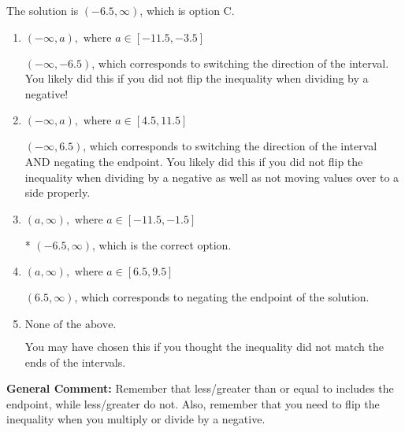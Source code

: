 \documentclass{extbook}[14pt]
\begin{document}
\begin{enumerate}
{The solution is \( (-6.5, \infty) \), which is option C.\begin{enumerate}[label=\Alph*.]
\item \( (-\infty, a), \text{ where } a \in [-11.5, -3.5] \)

 $(-\infty, -6.5)$, which corresponds to switching the direction of the interval. You likely did this if you did not flip the inequality when dividing by a negative!
\item \( (-\infty, a), \text{ where } a \in [4.5, 11.5] \)

 $(-\infty, 6.5)$, which corresponds to switching the direction of the interval AND negating the endpoint. You likely did this if you did not flip the inequality when dividing by a negative as well as not moving values over to a side properly.
\item \( (a, \infty), \text{ where } a \in [-11.5, -1.5] \)

* $(-6.5, \infty)$, which is the correct option.
\item \( (a, \infty), \text{ where } a \in [6.5, 9.5] \)

 $(6.5, \infty)$, which corresponds to negating the endpoint of the solution.
\item \( \text{None of the above}. \)

You may have chosen this if you thought the inequality did not match the ends of the intervals.
\end{enumerate}

\textbf{General Comment:} Remember that less/greater than or equal to includes the endpoint, while less/greater do not. Also, remember that you need to flip the inequality when you multiply or divide by a negative.
}
\end{enumerate}
\end{document}
